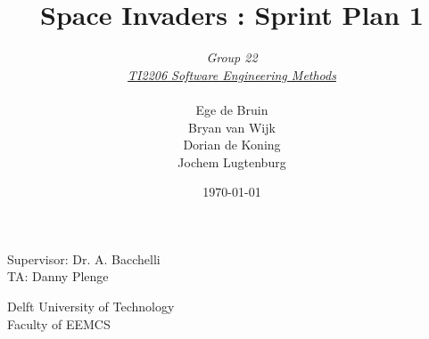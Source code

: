 \documentclass[10pt]{article}
\begin{document}
\title{Space Invaders : Sprint Plan 1}
\date{\today}
\author{\textit{Group 22}\\ \textit{\underline{TI2206 Software Engineering Methods}} \\
 \\Ege de Bruin \\ Bryan van Wijk \\ Dorian de Koning \\ Jochem Lugtenburg }
 \maketitle  
 \begin{center}
Supervisor: Dr. A. Bacchelli\\
TA: Danny Plenge\\
 \end{center}     
 \begin{center}
 Delft University of Technology\\
 Faculty of EEMCS\\
 \end{center}
 \thispagestyle{empty}
 \pagebreak
 
\end{document}
